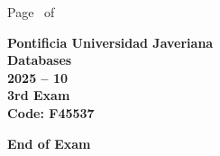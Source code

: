 \documentclass[11pt, addpoints, answers]{exam}\usepackage[utf8]{inputenc}
\begin{document}
\begin{coverpages}
\begin{center}
			\vspace{3mm}
			\leavevmode \hspace{5mm} 
		\end{center}
	\end{coverpages}

	\footer{} {Page \thepage\ of \numpages} {}

	\centering
	\textbf{\Large Pontificia Universidad Javeriana}\\
	\textbf{\Large Databases} \\
	\textbf{\large 2025 -- 10} \\
	\textbf{\large 3rd Exam} \\
	\textbf{Code: F45537}


	\begin{questions}
		
		
		
		
		
		
		
		
		
		
		
		
		
		
		
		
		
		
		
		
	\end{questions}

	\vspace{5mm}
	\noindent \textbf{End of Exam}
\end{document}
